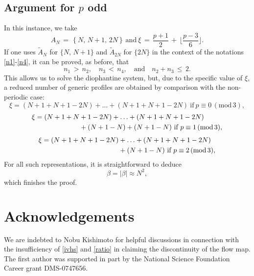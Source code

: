 \documentclass{amsart}
\begin{document}
\subsection{Argument for $p$ odd} In this instance, we take
\[
A_N\,=\,\left\{N,\, N+1, \, 2N\right\}\ \text{and} \ \xi\,=\,\frac{p+1}{2}\,+\, \lfloor\frac{p-3}{6}\rfloor.
\]
If one uses $\tilde{A}_N$ for $\{N,\,N+1\}$ and $\tilde{A}_{2N}$ for $\{2N\}$ in the context of the notations \eqref{n1}-\eqref{n4}, it can be proved, as before, that
\[
n_1\,>\,n_2, \quad n_3\,<\,n_4, \quad \text{and} \quad n_2+n_3\, \leq\, 2.\]
This allows us to solve the diophantine system, but, due to the specific value of $\xi$, a reduced number of generic profiles are obtained by comparison with the non-periodic case:
\begin{equation}
\xi=(N+1+N+1-2N)+\ldots+(N+1+N+1-2N) \ \text{if}\ p\equiv 0\, (\text{mod}\,3),
\label{0mod3p}
\end{equation}
\begin{equation}
\aligned
\xi= (N+1+N&+1-2N)+\ldots+(N+1+N+1-2N)\\
&+(N+1-N)+(N+1-N) \ \text{if}\ p\equiv 1\, (\text{mod}\,3),
\endaligned
\label{1mod3p}
\end{equation}
\begin{equation}
\aligned
\xi= (N+1+N+1-2N)&+\ldots+(N+1+N+1-2N)\\
&+(N+1-N) \ \text{if}\ p\equiv 2\, (\text{mod}\,3), 
\endaligned
\label{2mod3p}
\end{equation}
For all such representations, it is straightforward to deduce
\[
\beta= |\beta| \approx N^2,
\]
which finishes the proof.

\section*{Acknowledgements}
We are indebted to Nobu Kishimoto for helpful discussions in connection with the insufficiency of \eqref{ivhs} and \eqref{ratio} in claiming the discontinuity of the flow map. The first author was supported in part by the National Science Foundation Career grant DMS-0747656. 




\end{document}
